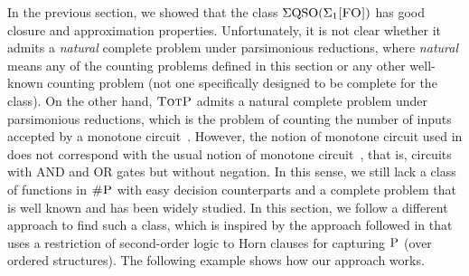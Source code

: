 In the previous section, we showed that the class $\Sigma{\rm QSO}(\Sigma_{1}\textsc{[FO]})$ has good closure and approximation properties. Unfortunately, it is not clear whether it admits a {\em natural} complete problem under parsimonious reductions, where {\em natural} means any of the counting problems defined in this section or any other well-known counting problem (not one specifically designed to be complete for the class). On the other hand, $\text{\sc TotP}$ admits a natural complete problem under parsimonious reductions, which is the problem of counting the number of inputs accepted by a monotone circuit~\cite{BCPPZ17}. However, the notion of monotone circuit used in \cite{BCPPZ17} does not correspond with the usual notion of monotone circuit~\cite{GS90}, that is, circuits with AND and OR gates but without negation. In this sense, we still lack a class of functions in $\text{\sc \#P}$ with easy decision counterparts and a complete problem that is well known and has been widely studied. In this section, we follow a different approach to find such a class,
which is inspired by the approach followed in \cite{G92} that uses a restriction of second-order logic to Horn clauses for capturing $\text{\sc P}$ (over ordered structures). The following example shows how our approach works.
